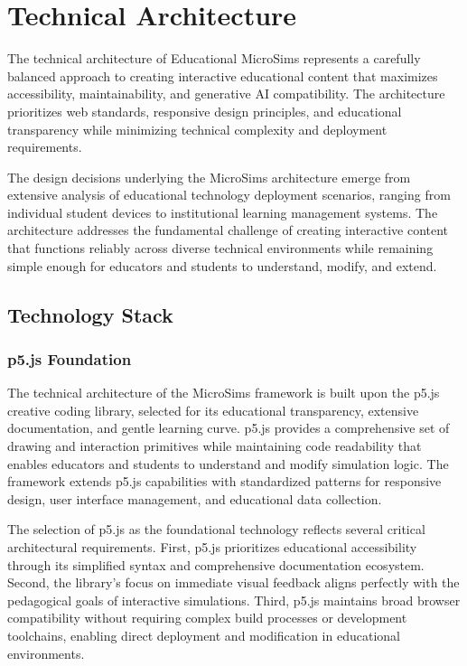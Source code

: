 \section{Technical Architecture}
\label{sec:architecture}

The technical architecture of Educational MicroSims represents a carefully balanced approach to creating interactive educational content that maximizes accessibility, maintainability, and generative AI compatibility. The architecture prioritizes web standards, responsive design principles, and educational transparency while minimizing technical complexity and deployment requirements.

The design decisions underlying the MicroSims architecture emerge from extensive analysis of educational technology deployment scenarios, ranging from individual student devices to institutional learning management systems. The architecture addresses the fundamental challenge of creating interactive content that functions reliably across diverse technical environments while remaining simple enough for educators and students to understand, modify, and extend.

\subsection{Technology Stack}

\subsubsection{p5.js Foundation}

The technical architecture of the MicroSims framework is built upon the p5.js creative coding library, selected for its educational transparency, extensive documentation, and gentle learning curve. p5.js provides a comprehensive set of drawing and interaction primitives while maintaining code readability that enables educators and students to understand and modify simulation logic. The framework extends p5.js capabilities with standardized patterns for responsive design, user interface management, and educational data collection.

The selection of p5.js as the foundational technology reflects several critical architectural requirements. First, p5.js prioritizes educational accessibility through its simplified syntax and comprehensive documentation ecosystem. Second, the library's focus on immediate visual feedback aligns perfectly with the pedagogical goals of interactive simulations. Third, p5.js maintains broad browser compatibility without requiring complex build processes or development toolchains, enabling direct deployment and modification in educational environments.

